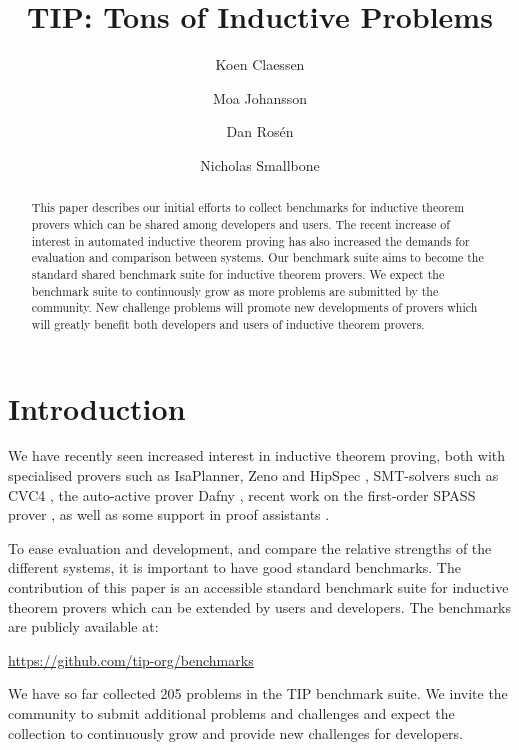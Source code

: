 \documentclass{llncs}
\begin{document}
\title{TIP: Tons of Inductive Problems}

\author{Koen Claessen \and Moa Johansson \and Dan Ros\'en \and Nicholas Smallbone}

\titlerunning{}

\maketitle

\begin{abstract} This paper describes our initial efforts to 
collect benchmarks for inductive theorem provers which can be 
shared among developers and users. The recent increase of 
interest in automated inductive theorem proving has also 
increased the demands for evaluation and comparison between 
systems. Our benchmark suite aims to become the standard shared 
benchmark suite for inductive theorem provers. We expect the 
benchmark suite to continuously grow as more problems are 
submitted by the community. New challenge problems will promote 
new developments of provers which will greatly benefit both 
developers and users of inductive theorem provers. 
\end{abstract}

\section{Introduction}

We have recently seen increased interest in inductive theorem 
proving, both with specialised provers such as IsaPlanner, Zeno 
and HipSpec \cite{hipspecCADE,dixon2007isaplanner,zeno}, 
SMT-solvers such as CVC4 \cite{cvc4}, the auto-active prover 
Dafny \cite{dafny}, recent work on the first-order SPASS prover 
\cite{SPASSInduction}, as well as some support in proof 
assistants \cite{hipster,acl2}.

To ease evaluation and development, and compare the relative 
strengths of the different systems, it is important to have good 
standard benchmarks. The contribution of this paper is an 
accessible standard benchmark suite for inductive theorem 
provers which can be extended by users and developers. The 
benchmarks are publicly available at:
\begin{center}
\url{https://github.com/tip-org/benchmarks}
\end{center}
We have so far collected 205 problems in the TIP benchmark 
suite. We invite the community to submit additional problems and 
challenges and expect the collection to continuously grow and 
provide new challenges for developers.
\end{document}
